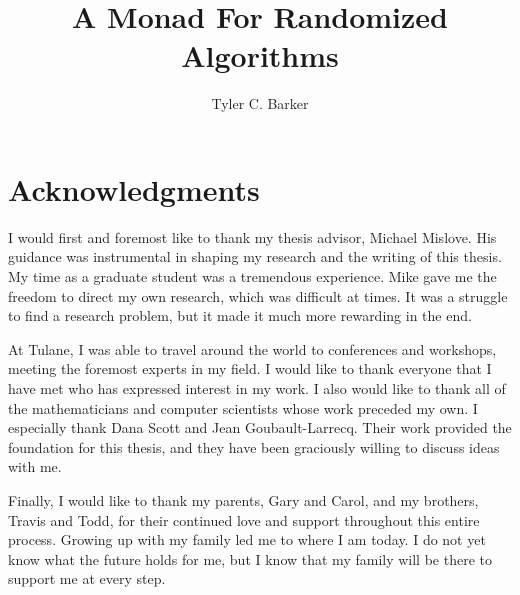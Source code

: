 \documentclass[10pt]{TUT}
\title{A Monad For Randomized Algorithms}
\author{Tyler C. Barker}
\begin{document}
\begin{abstract}

\end{abstract}

\maketitle

%


%


\frontmatter
\setcounter{page}{2}

\chapter*{Acknowledgments}
I would first and foremost like to thank my thesis advisor, Michael Mislove.  His guidance was instrumental in shaping my research and the writing of this thesis.  My time as a graduate student was a tremendous experience.  Mike gave me the freedom to direct my own research, which was difficult at times.  It was a struggle to find a research problem, but it made it much more rewarding in the end. 

At Tulane, I was able to travel around the world to conferences and workshops, meeting the foremost experts in my field.  I would like to thank everyone that I have met who has expressed interest in my work.  I also would like to thank all of the mathematicians and computer scientists whose work preceded my own.  I especially thank Dana Scott and Jean Goubault-Larrecq.  Their work provided the foundation for this thesis, and they have been graciously willing to discuss ideas with me.

Finally, I would like to thank my parents, Gary and Carol, and my brothers, Travis and Todd, for their continued love and support throughout this entire process.  Growing up with my family led me to where I am today.  I do not yet know what the future holds for me, but I know that my family will be there to support me at every step.
\end{document}
